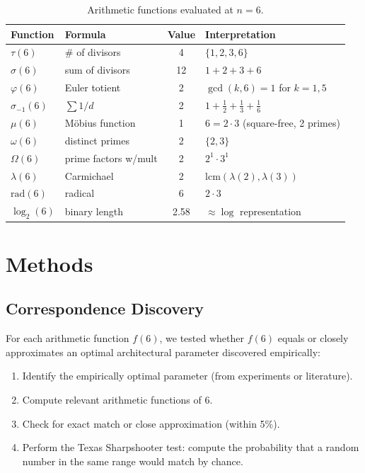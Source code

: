 \documentclass[12pt]{article}
\begin{document}
\begin{table}[h]
\centering
\begin{tabular}{llcl}
\toprule
Function & Formula & Value & Interpretation \\
\midrule
$\tau(6)$ & \# of divisors & 4 & $\{1, 2, 3, 6\}$ \\
$\sigma(6)$ & sum of divisors & 12 & $1+2+3+6$ \\
$\varphi(6)$ & Euler totient & 2 & $\gcd(k,6)=1$ for $k=1,5$ \\
$\sigma_{-1}(6)$ & $\sum 1/d$ & 2 & $1+\frac{1}{2}+\frac{1}{3}+\frac{1}{6}$ \\
$\mu(6)$ & M\"{o}bius function & 1 & $6=2\cdot3$ (square-free, 2 primes) \\
$\omega(6)$ & distinct primes & 2 & $\{2, 3\}$ \\
$\Omega(6)$ & prime factors w/mult & 2 & $2^1 \cdot 3^1$ \\
$\lambda(6)$ & Carmichael & 2 & $\mathrm{lcm}(\lambda(2),\lambda(3))$ \\
$\mathrm{rad}(6)$ & radical & 6 & $2 \cdot 3$ \\
$\log_2(6)$ & binary length & 2.58 & $\approx \log$ representation \\
\bottomrule
\end{tabular}
\caption{Arithmetic functions evaluated at $n=6$.}
\label{tab:arith}
\end{table}

\section{Methods}

\subsection{Correspondence Discovery}

For each arithmetic function $f(6)$, we tested whether $f(6)$ equals or closely approximates an optimal architectural parameter discovered empirically:

\begin{enumerate}
    \item Identify the empirically optimal parameter (from experiments or literature).
    \item Compute relevant arithmetic functions of 6.
    \item Check for exact match or close approximation (within 5\%).
    \item Perform the Texas Sharpshooter test: compute the probability that a random number in the same range would match by chance.
\end{enumerate}
\end{document}
